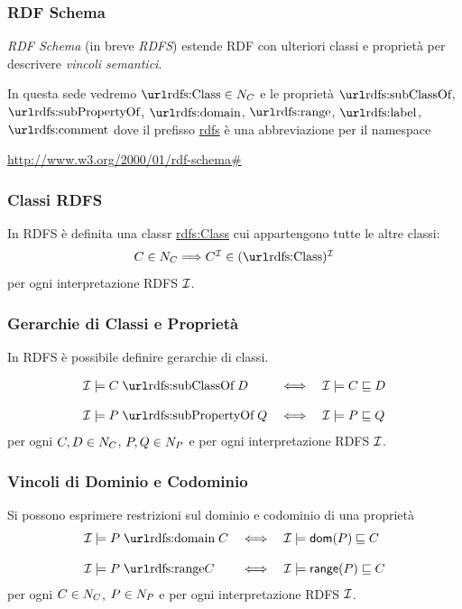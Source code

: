\documentclass[8pt]{beamer}
\begin{document}
\begin{frame}
 \frametitle{RDF Schema}
 \emph{RDF Schema} (in breve \emph{RDFS}) estende RDF con 
 ulteriori classi e propriet\`a per descrivere \emph{vincoli semantici}.
 \vspace{\baselineskip}
 
 In questa sede vedremo $\mathurl{rdfs:Class} \in \CNames$ e le propriet\`a 
 $\mathurl{rdfs:subClassOf}$, $\mathurl{rdfs:subPropertyOf}$,
 $\mathurl{rdfs:domain}$, $\mathurl{rdfs:range}$, $\mathurl{rdfs:label}$,
 $\mathurl{rdfs:comment}$ dove il prefisso \url{rdfs} \`e una abbreviazione per
 il namespace
\begin{center}
 \url{http://www.w3.org/2000/01/rdf-schema\#}
\end{center}
\end{frame}

\begin{frame}
 \frametitle{Classi RDFS}
 In RDFS \`e definita una classr \url{rdfs:Class} cui appartengono tutte le
 altre classi:
\[
\begin{array}{lcl}
	C \in \CNames \Longrightarrow C^{\I} \in  (\mathurl{rdfs:Class})^{\I}\\
\end{array}
\]
per ogni interpretazione RDFS $\mathcal{I}$. 
\end{frame}

\begin{frame}
 \frametitle{Gerarchie di Classi e Propriet\`a}
 In RDFS \`e possibile definire gerarchie di classi.

\[
\begin{array}{lcl}
	\I \models C\;\mathurl{rdfs:subClassOf}\;D & \iff & \I \models C \Issub D\\
	&&\\
	\I \models P\;\mathurl{rdfs:subPropertyOf}\;Q & \iff & \I \models P \Issub Q\\
\end{array}
\]
per ogni $C, D \in N_C$, $P, Q \in N_P$ e per ogni interpretazione RDFS
$\mathcal{I}$.
\end{frame}

\begin{frame}
 \frametitle{Vincoli di Dominio e Codominio}
 Si possono esprimere restrizioni sul dominio e codominio di una proprietà
\[
\begin{array}{lcl}
	\I \models P\;\mathurl{rdfs:domain}\;C & \iff & \I \models \dom(P) \Issub C\\
	&&\\
	\I \models P\;\mathurl{rdfs:range}C & \iff & \I \models \range(P) \Issub C\\
\end{array}
\]
per ogni $C \in N_C$, $P \in N_P$ e per ogni interpretazione RDFS
$\mathcal{I}$.
\end{frame}
\end{document}
